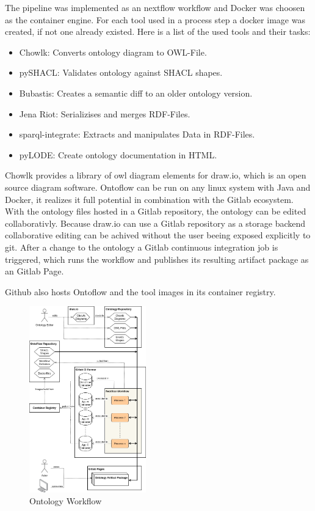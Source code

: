 \documentclass[sigconf]{acmart}
\begin{document}
The pipeline was implemented as an nextflow workflow and Docker was choosen as the container engine.
For each tool used in a process step a docker image was created, if not one already existed.
Here is a list of the used tools and their tasks:

\begin{itemize}
  \item Chowlk: Converts ontology diagram to OWL-File.
  \item pySHACL: Validates ontology against SHACL shapes.
  \item Bubastis: Creates a semantic diff to an older ontology version.
  \item Jena Riot: Serializises and merges RDF-Files.
  \item sparql-integrate: Extracts and manipulates Data in RDF-Files.
  \item pyLODE: Create ontology documentation in HTML.
\end{itemize}

Chowlk provides a library of owl diagram elements for draw.io, which is an open source diagram software.
Ontoflow can be run on any linux system with Java and Docker, it realizes it full potential in combination with the Gitlab ecosystem.
With the ontology files hosted in a Gitlab repository, the ontology can be edited collaborativly. Because draw.io can use a Gitlab repository as a storage backend collaborative editing can be achived without the user beeing exposed explicitly to git.
After a change to the ontology a Gitlab continuous integration job is triggered, which runs the workflow and publishes its resulting artifact package as an Gitlab Page.


Github also hosts Ontoflow and the tool images in its container registry.


\begin{figure}[ht]
  \centering
  \includegraphics[width=0.45\textwidth]{architecture.png}
  \caption{Ontology Workflow}
  \label{fig2}
\end{figure}
\end{document}
